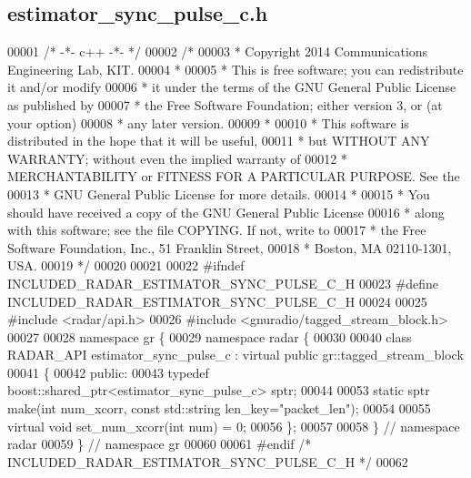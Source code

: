 \subsection{estimator\+\_\+sync\+\_\+pulse\+\_\+c.\+h}
\label{estimator__sync__pulse__c_8h_source}

\begin{DoxyCode}
00001 \textcolor{comment}{/* -*- c++ -*- */}
00002 \textcolor{comment}{/* }
00003 \textcolor{comment}{ * Copyright 2014 Communications Engineering Lab, KIT.}
00004 \textcolor{comment}{ * }
00005 \textcolor{comment}{ * This is free software; you can redistribute it and/or modify}
00006 \textcolor{comment}{ * it under the terms of the GNU General Public License as published by}
00007 \textcolor{comment}{ * the Free Software Foundation; either version 3, or (at your option)}
00008 \textcolor{comment}{ * any later version.}
00009 \textcolor{comment}{ * }
00010 \textcolor{comment}{ * This software is distributed in the hope that it will be useful,}
00011 \textcolor{comment}{ * but WITHOUT ANY WARRANTY; without even the implied warranty of}
00012 \textcolor{comment}{ * MERCHANTABILITY or FITNESS FOR A PARTICULAR PURPOSE.  See the}
00013 \textcolor{comment}{ * GNU General Public License for more details.}
00014 \textcolor{comment}{ * }
00015 \textcolor{comment}{ * You should have received a copy of the GNU General Public License}
00016 \textcolor{comment}{ * along with this software; see the file COPYING.  If not, write to}
00017 \textcolor{comment}{ * the Free Software Foundation, Inc., 51 Franklin Street,}
00018 \textcolor{comment}{ * Boston, MA 02110-1301, USA.}
00019 \textcolor{comment}{ */}
00020 
00021 
00022 \textcolor{preprocessor}{#ifndef INCLUDED\_RADAR\_ESTIMATOR\_SYNC\_PULSE\_C\_H}
00023 \textcolor{preprocessor}{#define INCLUDED\_RADAR\_ESTIMATOR\_SYNC\_PULSE\_C\_H}
00024 
00025 \textcolor{preprocessor}{#include <radar/api.h>}
00026 \textcolor{preprocessor}{#include <gnuradio/tagged\_stream\_block.h>}
00027 
00028 \textcolor{keyword}{namespace }gr \{
00029   \textcolor{keyword}{namespace }radar \{
00030 
00040     \textcolor{keyword}{class }RADAR_API estimator_sync_pulse_c : \textcolor{keyword}{virtual} \textcolor{keyword}{public} gr::tagged\_stream\_block
00041     \{
00042      \textcolor{keyword}{public}:
00043       \textcolor{keyword}{typedef} boost::shared\_ptr<estimator\_sync\_pulse\_c> sptr;
00044 
00053       \textcolor{keyword}{static} sptr make(\textcolor{keywordtype}{int} num\_xcorr, \textcolor{keyword}{const} std::string len\_key=\textcolor{stringliteral}{"packet\_len"});
00054       
00055       \textcolor{keyword}{virtual} \textcolor{keywordtype}{void} set\_num\_xcorr(\textcolor{keywordtype}{int} num) = 0;
00056     \};
00057 
00058   \} \textcolor{comment}{// namespace radar}
00059 \} \textcolor{comment}{// namespace gr}
00060 
00061 \textcolor{preprocessor}{#endif }\textcolor{comment}{/* INCLUDED\_RADAR\_ESTIMATOR\_SYNC\_PULSE\_C\_H */}\textcolor{preprocessor}{}
00062 
\end{DoxyCode}
